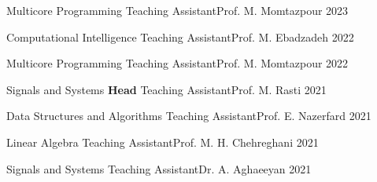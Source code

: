 \newcommand{\taprefix}{Teaching Assistant{\enskip\cdotp\enskip}}

\begin{cvhonors}

  \cvhonor
    {Multicore Programming} %
    {\taprefix Prof. M. Momtazpour} %
    {} %
    {2023} %

  \cvhonor
    {Computational Intelligence} %
    {\taprefix Prof. M. Ebadzadeh} %
    {} %
    {2022} %

  \cvhonor
    {Multicore Programming} %
    {\taprefix Prof. M. Momtazpour} %
    {} %
    {2022} %

  \cvhonor
    {Signals and Systems} %
    {\textbf{Head} \taprefix Prof. M. Rasti} %
    {} %
    {2021} %

  \cvhonor
    {Data Structures and Algorithms} %
    {\taprefix Prof. E. Nazerfard} %
    {} %
    {2021} %

  \cvhonor
    {Linear Algebra} %
    {\taprefix Prof. M. H. Chehreghani} %
    {} %
    {2021} %

  \cvhonor
    {Signals and Systems} %
    {\taprefix Dr. A. Aghaeeyan} %
    {} %
    {2021} %

\end{cvhonors}
